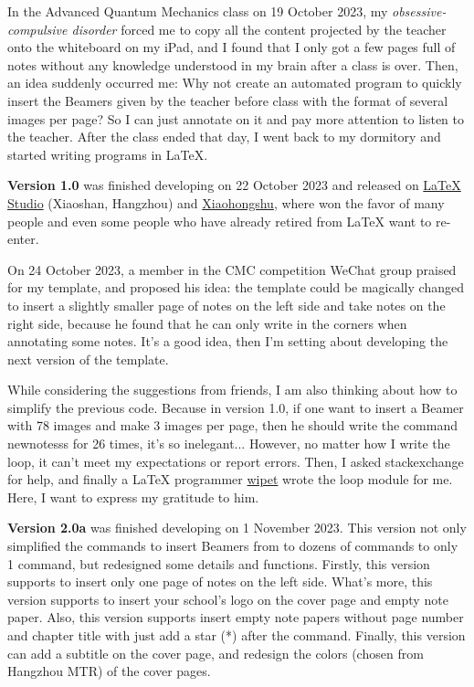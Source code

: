 \documentclass[11pt]{article}
\def\cmd#1{\texorpdfstring{\textcolor{cmdcolor}{\textsf{#1}}}{“#1”}}
\begin{document}
In the Advanced Quantum Mechanics class on 19 October 2023, my \emph{obsessive-compulsive disorder} forced me to copy all the content projected by the teacher onto the whiteboard on my iPad, and I found that I only got a few pages full of notes without any knowledge understood in my brain after a class is over. Then, an idea suddenly occurred me: Why not create an automated program to quickly insert the Beamers given by the teacher before class with the format of several images per page? So I can just annotate on it and pay more attention to listen to the teacher. After the class ended that day, I went back to my dormitory and started writing programs in \textsf\LaTeX{}.

\textsf{\bfseries Version 1.0} was finished developing on 22 October 2023 and released on \href{https://www.latexstudio.net/index/details/index/mid/3720.html}{LaTeX Studio} (Xiaoshan, Hangzhou) and \href{https://www.xiaohongshu.com/user/profile/61e7ad870000000010005642}{Xiaohongshu}, where won the favor of many people and even some people who have already retired from \textsf\LaTeX{} want to re-enter.

On 24 October 2023, a member in the CMC competition WeChat group praised for my template, and proposed his idea: the template could be magically changed to insert a slightly smaller page of notes on the left side and take notes on the right side, because he found that he can only write in the corners when annotating some notes. It's a good idea, then I'm setting about developing the next version of the template.

While considering the suggestions from friends, I am also thinking about how to simplify the previous code. Because in version 1.0, if one want to insert a Beamer with 78 images and make 3 images per page, then he should write the command \cmd{newnotesss} for 26 times, it's so inelegant... However, no matter how I write the loop, it can't meet my expectations or report errors. Then, I asked stackexchange for help, and finally a LaTeX programmer \href{https://tex.stackexchange.com/users/51799/wipet}{wipet} wrote the loop module for me. Here, I want to express my gratitude to him.

\textsf{\bfseries Version 2.0a} was finished developing on 1 November 2023. This version not only simplified the commands to insert Beamers from to dozens of commands to only 1 command, but redesigned some details and functions. Firstly, this version supports to insert only one page of notes on the left side. What's more, this version supports to insert your school's logo on the cover page and empty note paper. Also, this version supports insert empty note papers without page number and chapter title with just add a star (*) after the command. Finally, this version can add a subtitle on the cover page, and redesign the colors (chosen from Hangzhou MTR) of the cover pages.
\end{document}
